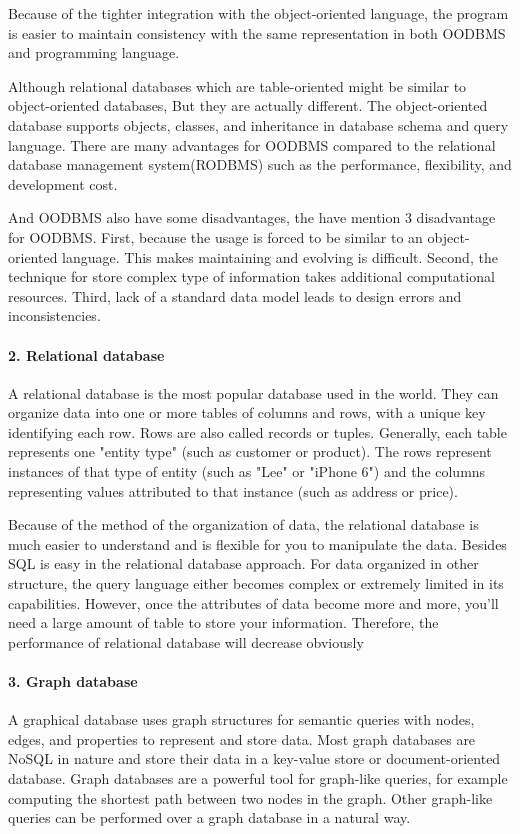 Because of the tighter integration with the object-oriented language, the program is easier to maintain consistency with the same representation in both OODBMS and programming language.

Although relational databases which are table-oriented might be similar to object-oriented databases, But they are actually different. The object-oriented database supports objects, classes, and inheritance in database schema and query language.
There are many advantages for OODBMS compared to the relational database management system(RODBMS) such as the performance, flexibility, and development cost.

And OODBMS also have some disadvantages, the \cite{Systems2010} have mention 3 disadvantage for OODBMS. First, because the usage is forced to be similar to an object-oriented language. This makes maintaining and evolving is difficult. Second, the technique for store complex type of information takes additional computational resources. Third, lack of a standard data model leads to design errors and inconsistencies.


\paragraph{2. Relational database}
A relational database is the most popular database used in the world. They can organize data into one or more tables of columns and rows, with a unique key identifying each row. Rows are also called records or tuples. Generally, each table represents one "entity type" (such as customer or product). The rows represent instances of that type of entity (such as "Lee" or "iPhone 6") and the columns representing values attributed to that instance (such as address or price).

Because of the method of the organization of data, the relational database is much easier to understand and is flexible for you to manipulate the data. Besides SQL is easy in the relational database approach. For data organized in other structure, the query language either becomes complex or extremely limited in its capabilities. However, once the attributes of data become more and more, you'll need a large amount of table to store your information. Therefore, the performance of relational database will decrease obviously


\paragraph{3. Graph database}
A graphical database uses graph structures for semantic queries with nodes, edges, and properties to represent and store data. Most graph databases are NoSQL in nature and store their data in a key-value store or document-oriented database. Graph databases are a powerful tool for graph-like queries, for example computing the shortest path between two nodes in the graph. Other graph-like queries can be performed over a graph database in a natural way.

